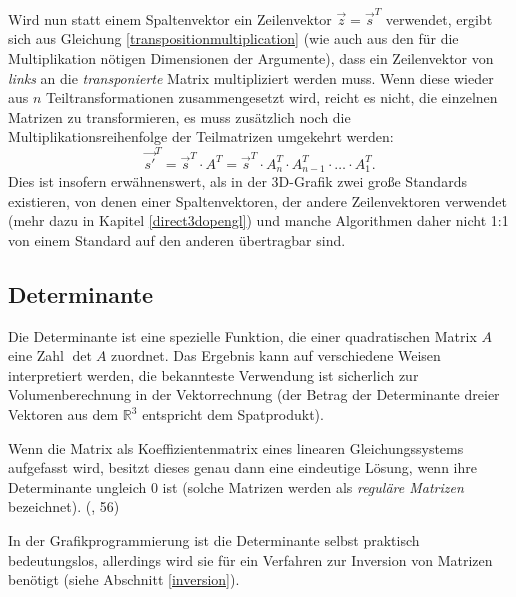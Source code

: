 Wird nun statt einem Spaltenvektor ein Zeilenvektor $\vec z = \vec{s}^T$ verwendet, ergibt sich aus Gleichung \ref{transpositionmultiplication} (wie auch aus den für die Multiplikation nötigen Dimensionen der Argumente), dass ein Zeilenvektor von \emph{links} an die \emph{transponierte} Matrix multipliziert werden muss. Wenn diese wieder aus $n$ Teiltransformationen zusammengesetzt wird, reicht es nicht, die einzelnen Matrizen zu transformieren, es muss zusätzlich noch die Multiplikationsreihenfolge der Teilmatrizen umgekehrt werden:
\begin{equation}
 \vec{s'}^T = \vec{s}^T \cdot A^T = \vec{s}^T \cdot A_n^T \cdot A_{n-1}^T \cdot \ldots \cdot A_1^T.
\end{equation}
Dies ist insofern erwähnenswert, als in der 3D-Grafik zwei große Standards existieren, von denen einer Spaltenvektoren, der andere Zeilenvektoren verwendet (mehr dazu in Kapitel \ref{direct3dopengl}) und manche Algorithmen daher nicht 1:1 von einem Standard auf den anderen übertragbar sind.


\subsection{Determinante}
Die Determinante ist eine spezielle Funktion, die einer quadratischen Matrix $A$ eine Zahl $\det A$ zuordnet. Das Ergebnis kann auf verschiedene Weisen interpretiert werden, die bekannteste Verwendung ist sicherlich zur Volumenberechnung in der Vektorrechnung (der Betrag der Determinante dreier Vektoren aus dem $\mathbb R^3$ entspricht dem Spatprodukt).

Wenn die Matrix als Koeffizientenmatrix eines linearen Gleichungssystems aufgefasst wird, besitzt dieses genau dann eine eindeutige Lösung, wenn ihre Determinante ungleich 0 ist (solche Matrizen werden als \emph{reguläre Matrizen} bezeichnet). (\vgl \citep{optimierung}, 56)

In der Grafikprogrammierung ist die Determinante selbst praktisch bedeutungslos, allerdings wird sie für ein Verfahren zur Inversion von Matrizen benötigt (siehe Abschnitt \ref{inversion}).


